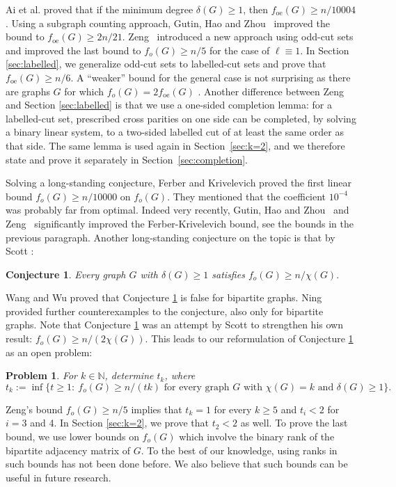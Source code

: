 \documentclass[11pt]{article}
\newcommand{\YZ}[1]{{#1}}
\newtheorem{problem}[theorem]{Problem}
\newtheorem{conjecture}[theorem]{Conjecture}
\theoremstyle{definition}
\theoremstyle{remark}
\newcommand{\foe}{f_{\mathrm{oe}}}
\newcommand{\fo}{f_o}
\newcommand{\1}{\mathbf{1}}
\begin{document}
	Ai et al. \cite{AiEtAl2026} proved that if the minimum degree $\delta(G)\ge 1$, then $ \foe(G)\ge n/10004$. 
	Using a subgraph counting approach, Gutin, Hao and Zhou~\cite{GHZ} improved the bound to
	$
	\foe(G)\ge 2n/21.
	$
	Zeng~\cite{Zeng} introduced a new approach using odd-cut sets and improved the last bound to  $\fo(G)\ge n/5$
	for the case of $\ell\equiv 1$. In Section \ref{sec:labelled}, we generalize odd-cut sets to labelled-cut sets and prove 
	that $\foe(G)\ge n/6.$ A ``weaker'' bound for the general case is not surprising as there are graphs $G$ for which 
	$\fo(G)=2\foe(G)$ \cite{AiEtAl2026}. Another difference between Zeng~\cite{Zeng} and Section \ref{sec:labelled} is that
	we use a one-sided completion lemma: for a labelled-cut set, prescribed cross parities on one
	side can be completed, by solving a binary linear system, to a two-sided labelled cut of at least the same order as that side. \YZ{The same lemma is used again in Section~\ref{sec:k=2}, and we therefore state and prove it separately in Section~\ref{sec:completion}.}
	
	Solving a long-standing conjecture, Ferber and Krivelevich \cite{FK2022} proved the first linear bound $\fo(G)\ge n/10000$ on $\fo(G)$. They mentioned
	that the coefficient $10^{-4}$ was probably far from optimal. Indeed very recently, Gutin, Hao and Zhou~\cite{GHZ}  and Zeng~\cite{Zeng} significantly improved the 
	Ferber-Krivelevich bound, see the bounds in the previous paragraph. Another long-standing conjecture on the topic is that by Scott \cite{Scott1992}:
	\begin{conjecture}\label{conj:Scott}
		Every graph $G$ with $\delta(G)\geq 1$ satisfies
		$
		\fo(G) \geq n/\chi(G).
		$
	\end{conjecture} 
	Wang and Wu  \cite{WangWu2024} proved that Conjecture \ref{conj:Scott} is false for bipartite graphs. Ning \cite{Ning2026} provided further counterexamples to the conjecture, also only for bipartite graphs. Note that Conjecture \ref{conj:Scott} was an attempt by Scott to strengthen his own result: $\fo(G) \geq n/(2\chi(G)).$  
	This leads to our reformulation of Conjecture \ref{conj:Scott} as an open problem:
	\begin{problem}\label{prob:tk}
		For $k\in \mathbb{N}$, determine $t_k$, where
		$$t_k:=\inf\{t \ge 1:\ \fo(G) \geq n/(tk)  \mbox{ for every graph $G$ with $\chi(G)=k$ and $\delta(G)\ge 1$} \}.$$
	\end{problem}
	Zeng's bound $\fo(G)\ge n/5$ implies that $t_k=1$ for every $k\ge 5$ and $t_i<2$ for $i=3$ and 4. In Section \ref{sec:k=2}, we prove that $t_2<2$ as well. 
	To prove the last bound, we use lower bounds on $\fo(G)$ which involve the binary rank of the bipartite adjacency matrix of $G.$ To the best of our knowledge, using ranks in such bounds has not been done before.  We also believe that such bounds can be useful in future research. 
	
\end{document}
